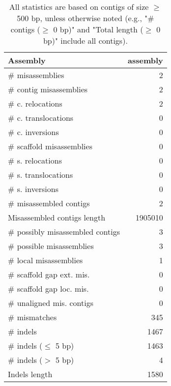 \documentclass[12pt,a4paper]{article}
\begin{document}
\begin{table}[ht]
\begin{center}
\caption{All statistics are based on contigs of size $\geq$ 500 bp, unless otherwise noted (e.g., "\# contigs ($\geq$ 0 bp)" and "Total length ($\geq$ 0 bp)" include all contigs).}
\begin{tabular}{|l*{1}{|r}|}
\hline
Assembly & assembly \\ \hline
\# misassemblies & 2 \\ \hline
\hspace{2mm}\# contig misassemblies & 2 \\ \hline
\hspace{5mm}\# c. relocations & 2 \\ \hline
\hspace{5mm}\# c. translocations & 0 \\ \hline
\hspace{5mm}\# c. inversions & 0 \\ \hline
\hspace{2mm}\# scaffold misassemblies & 0 \\ \hline
\hspace{5mm}\# s. relocations & 0 \\ \hline
\hspace{5mm}\# s. translocations & 0 \\ \hline
\hspace{5mm}\# s. inversions & 0 \\ \hline
\# misassembled contigs & 2 \\ \hline
Misassembled contigs length & 1905010 \\ \hline
\# possibly misassembled contigs & 3 \\ \hline
\hspace{5mm}\# possible misassemblies & 3 \\ \hline
\# local misassemblies & 1 \\ \hline
\# scaffold gap ext. mis. & 0 \\ \hline
\# scaffold gap loc. mis. & 0 \\ \hline
\# unaligned mis. contigs & 0 \\ \hline
\# mismatches & 345 \\ \hline
\# indels & 1467 \\ \hline
\hspace{5mm}\# indels ($\leq$ 5 bp) & 1463 \\ \hline
\hspace{5mm}\# indels ($>$ 5 bp) & 4 \\ \hline
Indels length & 1580 \\ \hline
\end{tabular}
\end{center}
\end{table}
\end{document}

